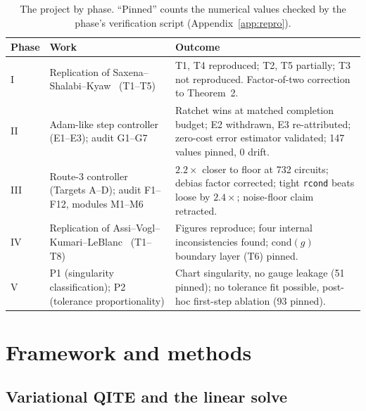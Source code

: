 \documentclass[aps,pra,reprint,superscriptaddress,nofootinbib]{revtex4-2}
\newcommand{\cond}{\mathrm{cond}}
\newcommand{\rcond}{\texttt{rcond}}
\begin{document}
\begin{table}[t]
\caption{The project by phase. ``Pinned'' counts the numerical values checked by the phase's verification script
(Appendix~\ref{app:repro}).}
\label{tab:chronology}
\begin{ruledtabular}
\begin{tabular}{lp{5.2cm}p{7.4cm}}
Phase & Work & Outcome \\
\midrule
I   & Replication of Saxena--Shalabi--Kyaw~\cite{QDP2024} (T1--T5)
    & T1, T4 reproduced; T2, T5 partially; T3 not reproduced. Factor-of-two correction to Theorem~2. \\
II  & Adam-like step controller (E1--E3); audit G1--G7
    & Ratchet wins at matched completion budget; E2 withdrawn, E3 re-attributed; zero-cost error estimator
      validated; 147 values pinned, 0 drift. \\
III & Route-3 controller (Targets A--D); audit F1--F12, modules M1--M6
    & $2.2\times$ closer to floor at 732 circuits; debias factor corrected; tight \rcond{} beats loose
      by $2.4\times$; noise-floor claim retracted. \\
IV  & Replication of Assi--Vogl--Kumari--LeBlanc~\cite{BeyondTrot2026} (T1--T8)
    & Figures reproduce; four internal inconsistencies found; $\cond(g)$ boundary layer (T6) pinned. \\
V   & P1 (singularity classification); P2 (tolerance proportionality)
    & Chart singularity, no gauge leakage (51 pinned); no tolerance fit possible, post-hoc
      first-step ablation (93 pinned). \\
\end{tabular}
\end{ruledtabular}
\end{table}

\section{Framework and methods}
\label{sec:methods}

\subsection{Variational QITE and the linear solve}
\end{document}
